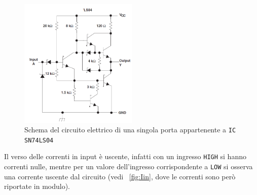 \documentclass[a4paper,10pt]{article}
\def\code#1{\texttt{#1}}
\begin{document}
\begin{figure}[H]
	\centering
	\includegraphics[width=0.5\textwidth]{../grafici/LS04.png}
	\caption{Schema del circuito elettrico di una singola porta appartenente a \code{IC SN74LS04}}
	\label{fig:LS04}
\end{figure}

Il verso delle correnti in input è uscente, infatti con un ingresso \code{HIGH} si hanno correnti nulle, mentre per un valore dell'ingresso corrispondente a \code{LOW} si osserva una corrente uscente dal circuito (vedi \figurename{~\ref{fig:Iin}}, dove le correnti sono però riportate in modulo).
\end{document}
